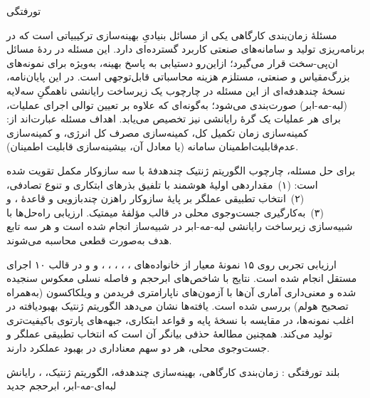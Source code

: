 

‌تورفتگی

مسئلهٔ زمان‌بندی کارگاهی
یکی از مسائل بنیادیِ بهینه‌سازی ترکیبیاتی است که در برنامه‌ریزی تولید و سامانه‌های صنعتی
کاربرد گسترده‌ای دارد.
این مسئله در ردهٔ مسائل ان‌پی-سخت قرار می‌گیرد؛ ازاین‌رو دستیابی به پاسخ بهینه،
به‌ویژه برای نمونه‌های بزرگ‌مقیاس و صنعتی، مستلزم هزینه محاسباتی قابل‌توجهی است.
در این پایان‌نامه، نسخهٔ چندهدفه‌ای از این مسئله در چارچوب یک زیرساخت رایانشی ناهمگنِ سه‌لایه
(لبه-مه-ابر) صورت‌بندی می‌شود؛ به‌گونه‌ای که علاوه بر تعیین توالی اجرای عملیات،
برای هر عملیات یک گرهٔ رایانشی نیز تخصیص می‌یابد.
اهداف مسئله عبارت‌اند از:
کمینه‌سازی زمان تکمیل کل،
کمینه‌سازی مصرف کل انرژی،
و کمینه‌سازی عدم‌قابلیت‌اطمینان سامانه (یا معادل آن، بیشینه‌سازی قابلیت اطمینان).

برای حل مسئله، چارچوب الگوریتم ژنتیک چندهدفهٔ 
با سه سازوکار مکمل تقویت شده است:
(۱)~مقداردهی اولیهٔ هوشمند با تلفیق بذرهای ابتکاری و تنوع تصادفی،
(۲)~انتخاب تطبیقی عملگر بر پایهٔ سازوکار راهزن چندبازویی و قاعدهٔ ،
و (۳)~به‌کارگیری جست‌وجوی محلی در قالب مؤلفهٔ میمتیک.
ارزیابی راه‌حل‌ها با شبیه‌سازی زیرساخت رایانشی لبه-مه-ابر
در شبیه‌ساز  انجام شده است و هر سه تابع هدف به‌صورت قطعی محاسبه می‌شوند.

ارزیابی تجربی روی ۱۵ نمونهٔ معیار از خانواده‌های
، ، ، ، ،  و 
و در قالب ۱۰ اجرای مستقل انجام شده است.
نتایج با شاخص‌های ابرحجم و فاصله نسلی معکوس سنجیده شده
و معنی‌داری آماری آن‌ها با آزمون‌های ناپارامتری فریدمن و ویلکاکسون
(به‌همراه تصحیح هولم) بررسی شده است.
یافته‌ها نشان می‌دهد الگوریتم ژنتیک بهبودیافته در اغلب نمونه‌ها،
در مقایسه با نسخهٔ پایه و قواعد ابتکاری، جبهه‌های پارتوی باکیفیت‌تری تولید می‌کند.
همچنین مطالعهٔ حذفی بیانگر آن است که انتخاب تطبیقی عملگر و جست‌وجوی محلی،
هر دو سهم معناداری در بهبود عملکرد دارند.

‌بلند
‌تورفتگی :
زمان‌بندی کارگاهی، بهینه‌سازی چندهدفه، الگوریتم ژنتیک، ، رایانش لبه‌ای-مه-ابر، ابرحجم
‌جدید
